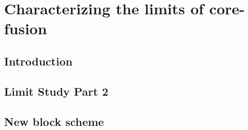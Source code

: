 \chapter{Characterizing the limits of core-fusion}

\section{Introduction}\label{sect:introduction-chapter3}

\section{Limit Study Part 2}

\section{New block scheme}

%
%
%